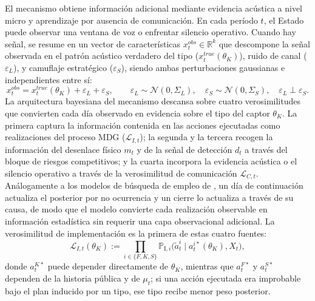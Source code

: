 \documentclass[pdflatex,sn-mathphys-ay]{sn-jnl}
\theoremstyle{thmstyleone}
\theoremstyle{thmstyletwo}
\theoremstyle{thmstylethree}
\newcommand{\1}{\mathbf{1}}
\newcommand{\ProbI}[1]{\mathbb{P}_{\mathrm{I},#1}}
\begin{document}
El mecanismo obtiene información adicional mediante evidencia acústica a nivel micro y aprendizaje por ausencia de comunicación. En cada período $t$, el Estado puede observar una ventana de voz o enfrentar silencio operativo. Cuando hay señal, se resume en un vector de características $x_t^{obs}\in\mathbb{R}^k$ que descompone la señal observada en el patrón acústico verdadero del tipo ($x_t^{true}(\theta_K)$), ruido de canal ($\varepsilon_L$), y camuflaje estratégico ($\varepsilon_S$), siendo ambas perturbaciones gaussianas e independientes entre sí:
\begin{equation}
x_t^{obs}=x_t^{true}(\theta_K)+\varepsilon_L+\varepsilon_S,\qquad\varepsilon_L\sim\mathcal{N}(0,\Sigma_L),\quad\varepsilon_S\sim\mathcal{N}(0,\Sigma_S),\quad\varepsilon_L\perp\varepsilon_S.
\label{eq:voz-descomp}
\end{equation}
La arquitectura bayesiana del mecanismo descansa sobre cuatro verosimilitudes que convierten cada día observado en evidencia sobre el tipo del captor $\theta_K$. La primera captura la información contenida en las acciones ejecutadas como realizaciones del proceso MDG ($\mathcal{L}_{I,t}$); la segunda y la tercera recogen la información del desenlace físico $m_t$ y de la señal de detección $d_t$ a través del bloque de riesgos competitivos; y la cuarta incorpora la evidencia acústica o el silencio operativo a través de la verosimilitud de comunicación $\mathcal{L}_{C,t}$. Análogamente a los modelos de búsqueda de empleo de \citet{McCall1970}, un día de continuación actualiza el posterior por no ocurrencia y un cierre lo actualiza a través de su causa, de modo que el modelo convierte cada realización observable en información estadística sin requerir una capa observacional adicional. La verosimilitud de implementación es la primera de estas cuatro fuentes:
\begin{equation}
\mathcal{L}_{I,t}(\theta_K):=\prod_{i\in\{F,K,S\}}\ProbI{i}\!\bigl(\tilde{a}_t^i\mid a_t^{i\ast}(\theta_K),X_t\bigr),
\label{eq:LI-atilde}
\end{equation}
donde $a_t^{K\ast}$ puede depender directamente de $\theta_K$, mientras que $a_t^{F\ast}$ y $a_t^{S\ast}$ dependen de la historia pública y de $\mu_t$; si una acción ejecutada era improbable bajo el plan inducido por un tipo, ese tipo recibe menor peso posterior.
\end{document}

